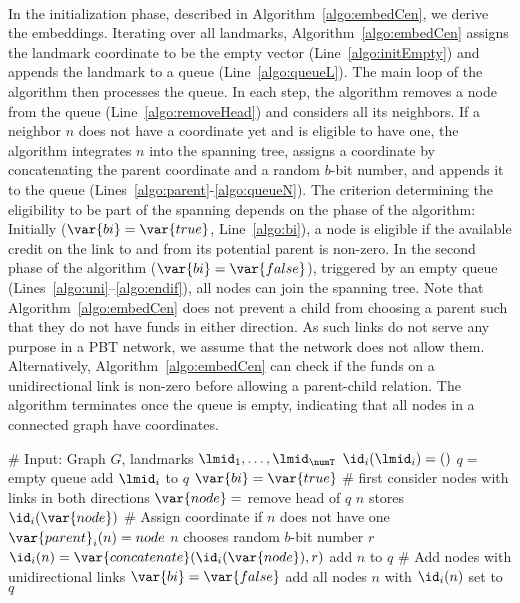 \paragraph*{\setRoute}  
In the initialization phase, described in Algorithm~\ref{algo:embedCen}, we derive the embeddings. 
Iterating over all landmarks, Algorithm~\ref{algo:embedCen} assigns the landmark coordinate to be the empty vector (Line~\ref{algo:initEmpty}) and appends the landmark to a  queue (Line~\ref{algo:queueL}). The main loop of the algorithm then processes the queue. In each step, the algorithm removes a node from the queue (Line~\ref{algo:removeHead}) and considers all its neighbors. If a neighbor $n$ does not have a coordinate yet and is eligible to have one, the algorithm integrates $n$ into the spanning tree, assigns a coordinate by concatenating the parent coordinate and a random $b$-bit number, and appends it to the queue (Lines~\ref{algo:parent}-\ref{algo:queueN}).   
The criterion determining the eligibility to be part of the spanning depends on the phase of the algorithm: Initially ($\var{bi}=\var{true}$, Line~\ref{algo:bi}), a node is eligible if the available credit on the link to and from its potential parent is non-zero. In the second phase of the algorithm ($\var{bi}=\var{false}$), triggered by an empty queue (Lines~\ref{algo:uni}--\ref{algo:endif}),  all nodes can join the spanning tree. Note that Algorithm~\ref{algo:embedCen} does not prevent a child from choosing a parent such that they do not have funds in either direction. As such links do not serve any purpose in a PBT network, we assume that the network does not allow them. Alternatively, Algorithm~\ref{algo:embedCen} can check if the funds on a unidirectional link is non-zero before allowing a parent-child relation.  
The algorithm terminates once the queue is empty, indicating that all nodes in a connected graph have coordinates. 

\begin{algorithm}[t]
\caption{\setRoute}
\label{algo:embedCen}
\begin{algorithmic}[1]
\STATE \# Input: Graph $G$, landmarks $\lmid_1, \ldots ,\lmid_{\numT}$
\STATE $\id_i(\lmid_i)=()$ \label{algo:initEmpty}
\STATE $q=$ empty queue
\STATE add $\lmid_i$ to $q$ \label{algo:queueL}
\STATE $\var{bi}=\var{true}$ \# first consider nodes with links in both directions  \label{algo:bi}
\STATE $\var{node} =$ remove head of $q$ \label{algo:removeHead}
\STATE $n$ stores $\id_i(\var{node})$
\STATE \# Assign coordinate if $n$ does not have one  
\STATE $\var{parent}_i(n)=node$ \label{algo:parent}
\STATE $n$ chooses random $b$-bit number $r$
\STATE $\id_i(n)=\var{concatenate}(\id_i(\var{node}), r)$ 
\STATE add $n$ to $q$ \label{algo:queueN}
\ENDIF
\ENDIF
\ENDFOR
\STATE \# Add nodes with unidirectional links \label{algo:uni} 
\STATE $\var{bi}=\var{false}$
\STATE add all nodes $n$ with $\id_i(n)$ set to $q$ 
\ENDIF \label{algo:endif} 
\ENDWHILE
\ENDFOR
\end{algorithmic}
\end{algorithm}

